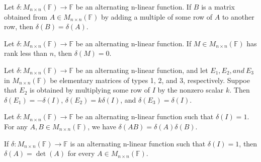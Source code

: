 \newpage
\begin{corollary}
    Let \(\delta: M_{n \times n}(\mathbb{F}) \to \mathbb{F}\) be an alternating n-linear function. If \(B\) is a matrix obtained from \(A \in M_{n \times n}(\mathbb{F})\) by adding a multiple of some row of \(A\) to another row, then \(\delta(B) = \delta(A)\).
\end{corollary}
\vspace{3cm}
\begin{corollary}
    Let \(\delta: M_{n \times n}(\mathbb{F}) \to \mathbb{F}\) be an alternating n-linear function. If \(M \in M_{n \times n}(\mathbb{F})\) has rank less than \(n\), then \(\delta(M) = 0\).
\end{corollary}
\vspace{2cm}
\begin{corollary}
    Let \(\delta: M_{n \times n}(\mathbb{F}) \to \mathbb{F}\) be an alternating n-linear function, and let \(E_1,E_2, and\ E_3\) in \(M_{n \times n}(\mathbb{F})\) be elementary matrices of types 1, 2, and 3, respectively. Suppoe that \(E_2\) is obtained by multiplying some row of \(I\) by the nonzero scalar \(k\). Then \(\delta(E_1) = -\delta(I)\), \(\delta(E_2) = k \delta(I)\), and \(\delta(E_3) = \delta(I)\).
\end{corollary}
\vspace{2cm}
\begin{theorem}
    Let \(\delta: M_{n \times n}(\mathbb{F}) \to \mathbb{F}\) be an alternating n-linear function such that \(\delta(I) = 1\). For any \(A,B \in M_{n \times n}(\mathbb{F})\), we have \(\delta(AB) = \delta(A) \delta(B)\).
\end{theorem}
\vspace{2cm}
\begin{theorem}
    If \(\delta: M_{n \times n}(\mathbb{F}) \to \mathbb{F}\) is an alternating n-linear function such that \(\delta(I) = 1\), then \(\delta(A) = \det(A)\) for every \(A \in M_{n \times n}(\mathbb{F})\).
\end{theorem}
\vspace{5cm}
